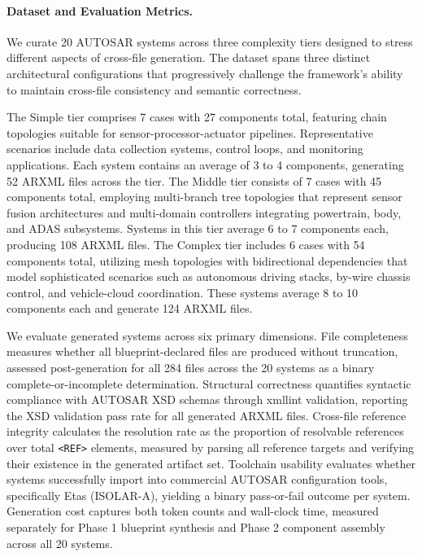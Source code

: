 \documentclass[acmlarge,nonacm]{acmart}
\theoremstyle{acmplain}
\theoremstyle{acmdefinition}
\begin{document}
\paragraph{Dataset and Evaluation Metrics.} We curate 20 AUTOSAR systems across three complexity tiers designed to stress different aspects of cross-file generation. The dataset spans three distinct architectural configurations that progressively challenge the framework's ability to maintain cross-file consistency and semantic correctness.

The Simple tier comprises 7 cases with 27 components total, featuring chain topologies suitable for sensor-processor-actuator pipelines. Representative scenarios include data collection systems, control loops, and monitoring applications. Each system contains an average of 3 to 4 components, generating 52 ARXML files across the tier. The Middle tier consists of 7 cases with 45 components total, employing multi-branch tree topologies that represent sensor fusion architectures and multi-domain controllers integrating powertrain, body, and ADAS subsystems. Systems in this tier average 6 to 7 components each, producing 108 ARXML files. The Complex tier includes 6 cases with 54 components total, utilizing mesh topologies with bidirectional dependencies that model sophisticated scenarios such as autonomous driving stacks, by-wire chassis control, and vehicle-cloud coordination. These systems average 8 to 10 components each and generate 124 ARXML files.

We evaluate generated systems across six primary dimensions. File completeness measures whether all blueprint-declared files are produced without truncation, assessed post-generation for all 284 files across the 20 systems as a binary complete-or-incomplete determination. Structural correctness quantifies syntactic compliance with AUTOSAR XSD schemas through xmllint validation, reporting the XSD validation pass rate for all generated ARXML files. Cross-file reference integrity calculates the resolution rate as the proportion of resolvable references over total \texttt{<REF>} elements, measured by parsing all reference targets and verifying their existence in the generated artifact set. Toolchain usability evaluates whether systems successfully import into commercial AUTOSAR configuration tools, specifically Etas (ISOLAR-A), yielding a binary pass-or-fail outcome per system. Generation cost captures both token counts and wall-clock time, measured separately for Phase 1 blueprint synthesis and Phase 2 component assembly across all 20 systems.
\end{document}
